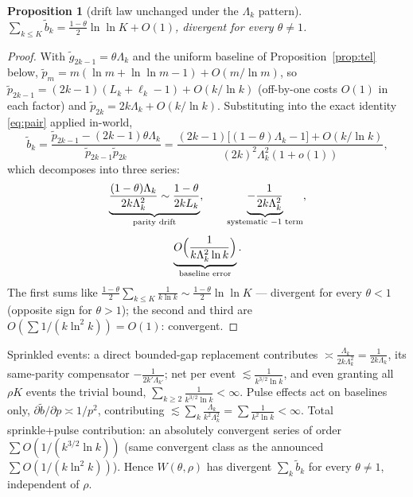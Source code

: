 \documentclass[11pt]{article}
\newtheorem{proposition}[theorem]{Proposition}
\theoremstyle{definition}
\begin{document}
\begin{proposition}[drift law unchanged under the $\Lambda_k$ pattern]\label{prop:drift}
$\displaystyle \sum_{k\le K}\tilde b_k=\frac{1-\theta}{2}\ln\ln K+O(1)$, divergent for every $\theta\ne1$.
\end{proposition}
\begin{proof}
With $\tilde g_{2k-1}=\theta\Lambda_k$ and the uniform baseline of Proposition~\ref{prop:tel} below, $\tilde p_m=m(\ln m+\ln\ln m-1)+O(m/\ln m)$, so $\tilde p_{2k-1}=(2k-1)(L_k+\ell_k-1)+O(k/\ln k)$ (off-by-one costs $O(1)$ in each factor) and $\tilde p_{2k}=2k\Lambda_k+O(k/\ln k)$. Substituting into the exact identity \eqref{eq:pair} applied in-world,
\[
\tilde b_k=\frac{\tilde p_{2k-1}-(2k-1)\theta\Lambda_k}{\tilde p_{2k-1}\tilde p_{2k}}
=\frac{(2k-1)\bigl[(1-\theta)\Lambda_k-1\bigr]+O(k/\ln k)}{(2k)^2\Lambda_k^2(1+o(1))},
\]
which decomposes into three series:
\[
\begin{gathered}
\underbrace{\frac{(1-\theta)\Lambda_k}{2k\Lambda_k^2}\sim\frac{1-\theta}{2kL_k}}_{\text{parity drift}},\qquad
\underbrace{-\frac{1}{2k\Lambda_k^2}}_{\text{systematic }-1\text{ term}},\\[4pt]
\underbrace{O\Bigl(\frac{1}{k\Lambda_k^2\ln k}\Bigr)}_{\text{baseline error}} .
\end{gathered}
\]
The first sums like $\frac{1-\theta}{2}\sum_{k\le K}\frac1{k\ln k}\sim\frac{1-\theta}{2}\ln\ln K$ --- divergent for every $\theta<1$ (opposite sign for $\theta>1$); the second and third are $O(\sum1/(k\ln^2k))=O(1)$: convergent.
\end{proof}

Sprinkled events: a direct bounded-gap replacement contributes $\asymp\frac{\Lambda_k}{2k\Lambda_k^2}=\frac{1}{2k\Lambda_k}$, its same-parity compensator $-\frac{1}{2k'\Lambda_{k'}}$; net per event $\lesssim\frac{1}{k^{3/2}\ln k}$, and even granting all $\rho K$ events the trivial bound, $\sum_{k\ge2}\frac{1}{k^{3/2}\ln k}<\infty$. Pulse effects act on baselines only, $\partial\tilde b/\partial p\asymp1/p^2$, contributing $\lesssim\sum_k\frac{\Lambda_k}{k^2\Lambda_k^2}=\sum\frac{1}{k^2\ln k}<\infty$. Total sprinkle+pulse contribution: an absolutely convergent series of order $\sum O(1/(k^{3/2}\ln k))$ (same convergent class as the announced $\sum O(1/(k\ln^2k))$). Hence $W(\theta,\rho)$ has divergent $\sum_k\tilde b_k$ for every $\theta\ne1$, independent of $\rho$.
\end{document}

